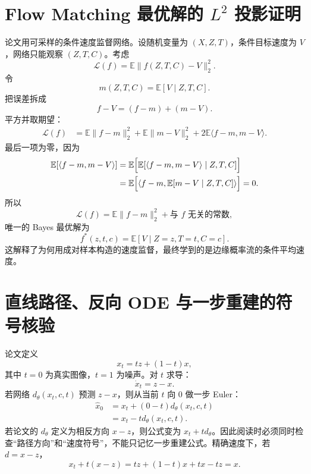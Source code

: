 \documentclass[UTF8,12pt,a4paper,fontset=none]{ctexart}
\numberwithin{equation}{section}
\newcommand{\E}{\mathbb{E}}
\newcommand{\Loss}{\mathcal{L}}
\begin{document}
\section{Flow Matching 最优解的 $L^2$ 投影证明}
论文用可采样的条件速度监督网络。设随机变量为 $(X,Z,T)$，条件目标速度为 $V$，网络只能观察 $(Z,T,C)$。考虑
\begin{equation}
 \Loss(f)=\E\|f(Z,T,C)-V\|_2^2.
\end{equation}
令
\begin{equation}
 m(Z,T,C)=\E[V\mid Z,T,C].
\end{equation}
把误差拆成
\begin{equation}
 f-V=(f-m)+(m-V).
\end{equation}
平方并取期望：
\begin{align}
 \Loss(f)
 &=\E\|f-m\|_2^2+\E\|m-V\|_2^2
 +2\E\langle f-m,m-V\rangle.
\end{align}
最后一项为零，因为
\begin{align}
 \E[\langle f-m,m-V\rangle]
 &=\E\Bigl[\E[\langle f-m,m-V\rangle\mid Z,T,C]\Bigr]\\
 &=\E\Bigl[\langle f-m,\E[m-V\mid Z,T,C]\rangle\Bigr]=0.
\end{align}
所以
\begin{equation}
 \Loss(f)=\E\|f-m\|_2^2+\text{与 $f$ 无关的常数},
\end{equation}
唯一的 Bayes 最优解为
\begin{equation}
 \boxed{f^*(z,t,c)=\E[V\mid Z=z,T=t,C=c].}
\end{equation}
这解释了为何用成对样本构造的速度监督，最终学到的是边缘概率流的条件平均速度。

\section{直线路径、反向 ODE 与一步重建的符号核验}
论文定义
\begin{equation}
 x_t=t z+(1-t)x,
\end{equation}
其中 $t=0$ 为真实图像，$t=1$ 为噪声。对 $t$ 求导：
\begin{equation}
 \dot x_t=z-x.
\end{equation}
若网络 $d_\theta(x_t,c,t)$ 预测 $z-x$，则从当前 $t$ 向 $0$ 做一步 Euler：
\begin{align}
 \widehat x_0
 &=x_t+(0-t)d_\theta(x_t,c,t)\\
 &=x_t-t d_\theta(x_t,c,t).
\end{align}
若论文的 $d_\theta$ 定义为相反方向 $x-z$，则公式变为 $x_t+t d_\theta$。因此阅读时必须同时检查“路径方向”和“速度符号”，不能只记忆一步重建公式。精确速度下，若 $d=x-z$，
\begin{equation}
 x_t+t(x-z)=tz+(1-t)x+t x-tz=x.
\end{equation}
\end{document}
